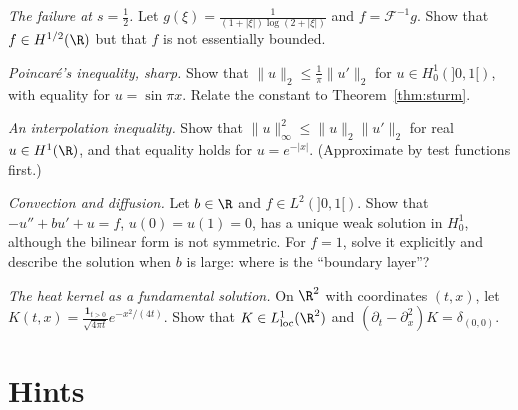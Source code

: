 \begin{exercise}[$\star\star$]\label{ex:loglog}
\emph{The failure at $s=\frac12$.} Let $g(\xi)=\frac1{(1+|\xi|)\log(2+|\xi|)}$ and $f=\mathcal F^{-1}g$. Show that $f\in H^{1/2}(\R)$ but that $f$ is not essentially bounded.
\end{exercise}

\begin{exercise}[$\star$]\label{ex:poincare}
\emph{Poincar\'e's inequality, sharp.} Show that $\|u\|_2\le\frac1\pi\|u'\|_2$ for $u\in H^1_0(]0,1[)$, with equality for $u=\sin\pi x$. Relate the constant to Theorem~\ref{thm:sturm}.
\end{exercise}

\begin{exercise}[$\star$]\label{ex:gagliardo}
\emph{An interpolation inequality.} Show that $\|u\|_\infty^2\le\|u\|_2\|u'\|_2$ for real $u\in H^1(\R)$, and that equality holds for $u=e^{-|x|}$. (Approximate by test functions first.)
\end{exercise}

\begin{exercise}[$\star\star$]\label{ex:convdiff}
\emph{Convection and diffusion.} Let $b\in\R$ and $f\in L^2(]0,1[)$. Show that $-u''+bu'+u=f$, $u(0)=u(1)=0$, has a unique weak solution in $H^1_0$, although the bilinear form is not symmetric. For $f=1$, solve it explicitly and describe
the solution when $b$ is large: where is the ``boundary layer''?
\end{exercise}

\begin{exercise}[$\star\star$]\label{ex:heatfund}
\emph{The heat kernel as a fundamental solution.} On $\R^2$ with coordinates $(t,x)$, let $K(t,x)=\frac{\mathbf 1_{t>0}}{\sqrt{4\pi t}}e^{-x^2/(4t)}$. Show that $K\in L^1_{\mathrm{loc}}(\R^2)$ and $(\partial_t-\partial_x^2)K=\delta_{(0,0)}$.
\end{exercise}

\section{Hints}

